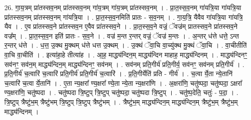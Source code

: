 \documentclass[17pt]{extarticle}
\begin{document}
26. गा॒य॒त्रम् प्रा॑तस्सव॒नम् प्रा॑तस्सव॒नम् गा॑य॒त्रम् गा॑य॒त्रम् प्रा॑तस्सव॒नम् । . प्रा॒त॒स्स॒व॒नम् गा॑यत्रि॒या गा॑यत्रि॒या प्रा॑तस्सव॒नम् प्रा॑तस्सव॒नम् गा॑यत्रि॒या । . प्रा॒त॒स्स॒व॒नमिति॑ प्रातः - स॒व॒नम् । . गा॒य॒त्रि॒ यैवैव गा॑यत्रि॒या गा॑यत्रि॒ यैव । . ए॒व प्रा॑तस्सव॒ने प्रा॑तस्सव॒न ए॒वैव प्रा॑तस्सव॒ने । . प्रा॒त॒स्स॒व॒ने वज्रं॒ ॅवज्र॑म् प्रातस्सव॒ने प्रा॑तस्सव॒ने वज्र᳚म् । . प्रा॒त॒स्स॒व॒न इति॑ प्रातः - स॒व॒ने । . वज्र॑ म॒न्त र॒न्तर् वज्रं॒ ॅवज्र॑ म॒न्तः । . अ॒न्तर् ध॑त्ते धत्ते॒ ऽन्त र॒न्तर् ध॑त्ते । . ध॒त्त॒ उ॒क्थ मु॒क्थम् ध॑त्ते धत्त उ॒क्थम् । . उ॒क्थं ॅवा॒चि वा॒च्यु॑क्थ मु॒क्थं ॅवा॒चि । . वा॒चीतीति॑ वा॒चि वा॒चीति॑ । . इत्या॑हा॒हे तीत्या॑ह । . आ॒ह॒ माद्ध्य॑न्दिन॒म् माद्ध्य॑न्दिन माहाह॒ माद्ध्य॑न्दिनम् । . माद्ध्य॑न्दिनꣳ॒॒ सव॑नꣳ॒॒ सव॑न॒म् माद्ध्य॑न्दिन॒म् माद्ध्य॑न्दिनꣳ॒॒ सव॑नम् । . सव॑नम् प्रति॒गीर्य॑ प्रति॒गीर्य॒ सव॑नꣳ॒॒ सव॑नम् प्रति॒गीर्य॑ । . प्र॒ति॒गीर्य॑ च॒त्वारि॑ च॒त्वारि॑ प्रति॒गीर्य॑ प्रति॒गीर्य॑ च॒त्वारि॑ । . प्र॒ति॒गीर्येति॑ प्रति - गीर्य॑ । . च॒त्वा र्ये॒ता न्ये॒तानि॑ च॒त्वारि॑ च॒त्वा र्ये॒तानि॑ । . ए॒ता न्य॒क्षरा᳚ ण्य॒क्षरा᳚ ण्ये॒ता न्ये॒ता न्य॒क्षरा॑णि । . अ॒क्षरा॑णि॒ चतु॑ष्पदा॒ चतु॑ष्पदा॒ ऽक्षरा᳚ ण्य॒क्षरा॑णि॒ चतु॑ष्पदा । . चतु॑ष्पदा त्रि॒ष्टुप् त्रि॒ष्टुप् चतु॑ष्पदा॒ चतु॑ष्पदा त्रि॒ष्टुप् । . चतु॑ष्प॒देति॒ चतुः॑ - प॒दा॒ । . त्रि॒ष्टुप् त्रैष्टु॑भ॒म् त्रैष्टु॑भम् त्रि॒ष्टुप् त्रि॒ष्टुप् त्रैष्टु॑भम् । . त्रैष्टु॑भ॒म् माद्ध्य॑न्दिन॒म् माद्ध्य॑न्दिन॒म् त्रैष्टु॑भ॒म् त्रैष्टु॑भ॒म् माद्ध्य॑न्दिनम् । \newline
\end{document}
